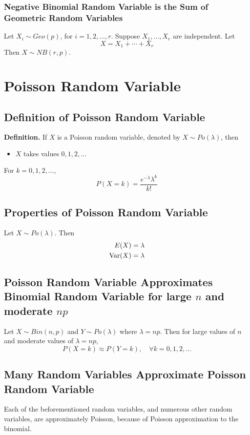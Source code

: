 \documentclass[../st2131_notes.tex]{subfiles}
\begin{document}
\subsubsection{Negative Binomial Random Variable is the Sum of Geometric Random Variables}
Let \(X_i\sim Geo(p)\), for \(i=1,2,\ldots,r\). Suppose \(X_1,\ldots,X_r\) are independent. Let
\[X=X_1+\cdots+X_r\]
Then \(X\sim NB(r,p)\).

\section{Poisson Random Variable}
\subsection{Definition of Poisson Random Variable}
\textbf{Definition.} If \(X\) is a Poisson random variable, denoted by \(X\sim Po(\lambda)\), then
\begin{itemize}
	\item\(X\) takes values \(0,1,2,\ldots\)
\end{itemize}
For \(k=0,1,2,\ldots\),
\[P(X=k)=\frac{e^{-\lambda}\lambda^k}{k!}\]

\subsection{Properties of Poisson Random Variable}
Let \(X\sim Po(\lambda)\). Then
\begin{align*}
	E(X)&=\lambda \\
	\operatorname{Var}(X)&=\lambda
\end{align*}

\subsection{Poisson Random Variable Approximates Binomial Random Variable for large $n$ and moderate $np$}
Let \(X\sim Bin(n,p)\) and \(Y\sim Po(\lambda)\) where \(\lambda=np\). Then for large values of \(n\) and moderate values of \(\lambda=np\),
\[P(X=k)\approx P(Y=k),\quad\forall k=0,1,2,\ldots\]

\subsection{Many Random Variables Approximate Poisson Random Variable}
Each of the beforementioned random variables, and numerous other random variables, are approximately Poisson, because of Poisson approximation to the binomial.
\end{document}

